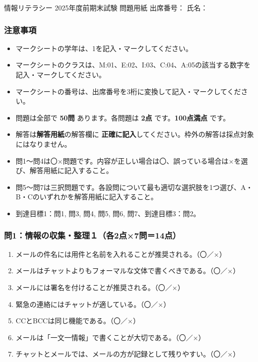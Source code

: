 \documentclass[a4paper,6pt,twoside]{jsarticle}
\newcommand{\OX}{\hfill（〇／×）}
\begin{document}
\begin{center}
\normalsize{情報リテラシー 2025年度前期末試験 問題用紙} \quad 出席番号：\underline{\hspace{1.5cm}} \quad 氏名：\underline{\hspace{6cm}}
\end{center}

\vspace{0mm}

\subsubsection*{注意事項}
{\small
\begin{itemize}
  \item マークシートの学年は、1を記入・マークしてください。
  \item マークシートのクラスは、M:01、E:02、I:03、C:04、A:05の該当する数字を記入・マークしてください。
  \item マークシートの番号は、出席番号を3桁に変換して記入・マークしてください。
  \item 問題は全部で \textbf{50問} あります。各問題は \textbf{2点} です。\textbf{100点満点} です。
  \item 解答は\textbf{解答用紙}の解答欄に \textbf{正確に記入}してください。枠外の解答は採点対象にはなりません。
  \item 問1〜問4は〇×問題です。内容が正しい場合は〇、誤っている場合は×を選び、解答用紙に記入すること。
  \item 問5〜問7は三択問題です。各設問について最も適切な選択肢を1つ選び、A・B・Cのいずれかを解答用紙に記入すること。
  \item 到達目標1：問1, 問3, 問4, 問5, 問6, 問7、到達目標3：問2。
\end{itemize}
}

\vspace{1mm}

\subsubsection*{問1：情報の収集・整理１（各2点×7問＝14点）}
\begin{enumerate}
\item メールの件名には用件と名前を入れることが推奨される。\OX
\item メールはチャットよりもフォーマルな文体で書くべきである。\OX
\item メールには署名を付けることが推奨される。\OX
\item 緊急の連絡にはチャットが適している。\OX
\item CCとBCCは同じ機能である。\OX
\item メールは「一文一情報」で書くことが大切である。\OX
\item チャットとメールでは、メールの方が記録として残りやすい。\OX
\end{enumerate}
\end{document}
